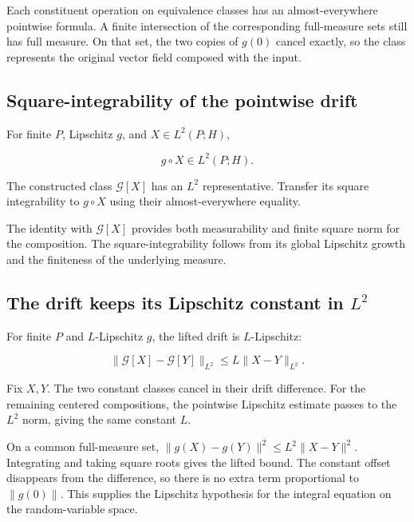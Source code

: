 \documentclass[11pt,a4paper]{report}
\begin{document}
Each constituent operation on equivalence classes has an almost-everywhere pointwise formula. A finite intersection of the corresponding full-measure sets still has full measure. On that set, the two copies of \(g(0)\) cancel exactly, so the class represents the original vector field composed with the input.

\subsection{\texorpdfstring{Square-integrability of the pointwise drift}{Square-integrability of the pointwise drift}}
\label{report-step-UnadjustedLangevin-LpDrift-lean-4}


For finite \(P\), Lipschitz \(g\), and \(X\in L^2(P;H)\),

\[g\circ X\in L^2(P;H).\]

The constructed class \(\mathcal G[X]\) has an \(L^2\) representative. Transfer its square integrability to \(g\circ X\) using their almost-everywhere equality.



The identity with \(\mathcal G[X]\) provides both measurability and finite square norm for the composition. The square-integrability follows from its global Lipschitz growth and the finiteness of the underlying measure.

\subsection{\texorpdfstring{The drift keeps its Lipschitz constant in \(L^2\)}{The drift keeps its Lipschitz constant in L²}}
\label{report-step-UnadjustedLangevin-LpDrift-lean-5}


For finite \(P\) and \(L\)-Lipschitz \(g\), the lifted drift is \(L\)-Lipschitz:

\[\|\mathcal G[X]-\mathcal G[Y]\|_{L^2}\le L\|X-Y\|_{L^2}.\]

Fix \(X,Y\). The two constant classes cancel in their drift difference. For the remaining centered compositions, the pointwise Lipschitz estimate passes to the \(L^2\) norm, giving the same constant \(L\).



On a common full-measure set, \(\|g(X)-g(Y)\|^2\le L^2\|X-Y\|^2\). Integrating and taking square roots gives the lifted bound. The constant offset disappears from the difference, so there is no extra term proportional to \(\|g(0)\|\). This supplies the Lipschitz hypothesis for the integral equation on the random-variable space.
\end{document}
